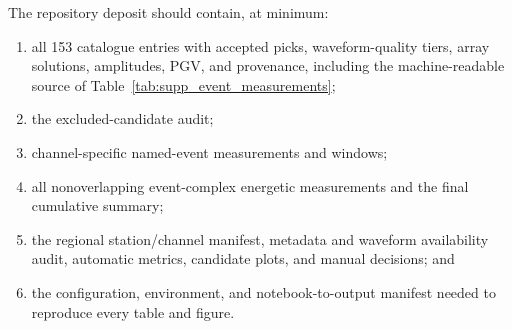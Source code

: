 \documentclass[]{seismica}
\begin{document}
The repository deposit should contain, at minimum:
\begin{enumerate}
  \item all 153 catalogue entries with accepted picks, waveform-quality tiers,
        array solutions, amplitudes, PGV, and provenance, including the
        machine-readable source of
        Table~\ref{tab:supp_event_measurements};
  \item the excluded-candidate audit;
  \item channel-specific named-event measurements and windows;
  \item all nonoverlapping event-complex energetic measurements and the final
        cumulative summary;
  \item the regional station/channel manifest, metadata and waveform
        availability audit, automatic metrics, candidate plots, and manual
        decisions; and
  \item the configuration, environment, and notebook-to-output manifest needed
        to reproduce every table and figure.
\end{enumerate}


\end{document}
